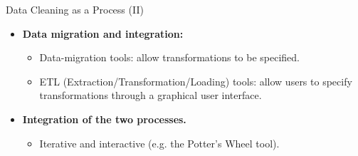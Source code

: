 \begin{frame}{Data Cleaning as a Process (II)}
	\begin{itemize}
		\item \textbf{Data migration and integration:}
		      \begin{itemize}
			      \item Data-migration tools: allow transformations to be
			            specified.
			      \item ETL (Extraction/Transformation/Loading) tools: allow
			            users to specify transformations through a graphical user
			            interface.
		      \end{itemize}
		\item \textbf{Integration of the two processes.}
		      \begin{itemize}
			      \item Iterative and interactive (e.g. the Potter's Wheel tool).
		      \end{itemize}
	\end{itemize}
\end{frame}
